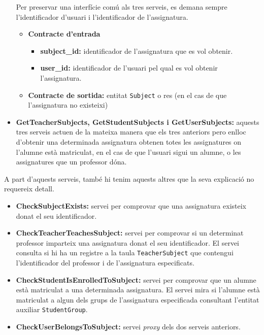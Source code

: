 \begin{itemize}
			Per preservar una interfície comú als tres serveis, es demana sempre l'identificador d'usuari i l'identificador de l'assignatura.
			
			\begin{itemize}
					\item \textbf{Contracte d'entrada}
						\begin{itemize}
							\item \textbf{subject\_id:} identificador de l'assignatura que es vol obtenir.
							\item \textbf{user\_id:} identificador de l'usuari pel qual es vol obtenir l'assignatura.
						\end{itemize}
					\item \textbf{Contracte de sortida:} entitat \texttt{Subject} o res (en el cas de que l'assignatura no existeixi)
				\end{itemize}
			\item \textbf{GetTeacherSubjects, GetStudentSubjects i GetUserSubjects:} aquests tres serveis actuen de la mateixa manera que els tres anteriors pero enlloc d'obtenir una determinada assignatura obtenen totes les assignatures on l'alumne està matriculat, en el cas de que l'usuari sigui un alumne, o les assignatures que un professor dóna.
		\end{itemize}
		
		A part d'aquests serveis, també hi tenim aquests altres que la seva explicació no requereix detall.
		
		\begin{itemize}
			\item \textbf{CheckSubjectExists:} servei per comprovar que una assignatura existeix donat el seu identificador.
			\item \textbf{CheckTeacherTeachesSubject:} servei per comprovar si un determinat professor imparteix una assignatura donat el seu identificador. El servei consulta si hi ha un registre a la taula \texttt{TeacherSubject} que contengui l'identificador del professor i de l'assignatura especificats.
			
			\item \textbf{CheckStudentIsEnrolledToSubject:} servei per comprovar que un alumne està matriculat a una determinada assignatura. El servei mira si l'alumne està matriculat a algun dels grups de l'assignatura especificada consultant l'entitat auxiliar \texttt{StudentGroup}.
			
			\item \textbf{CheckUserBelongsToSubject:} servei \emph{proxy} dels dos serveis anteriors.
		\end{itemize}
		
